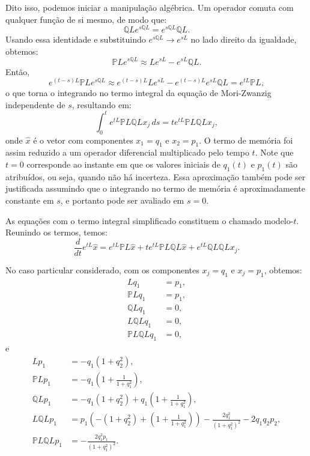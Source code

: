 \documentclass[12pt]{article}
\begin{document}
Dito isso, podemos iniciar a manipulação algébrica. Um operador comuta com qualquer função de si mesmo, de modo que:
\begin{equation*}
	\mathbb{Q}Le^{s\mathbb{Q}L} = e^{s\mathbb{Q}L} \mathbb{Q}L.
\end{equation*}
Usando essa identidade e substituindo $e^{s\mathbb{Q}L} \to e^{sL}$ no lado direito da igualdade, obtemos:
\begin{equation*}
	\mathbb{P}Le^{s\mathbb{Q}L} \approx Le^{sL} - e^{sL} \mathbb{Q}L.
\end{equation*}
Então,
\begin{equation*}
	e^{(t-s)L} \mathbb{P}Le^{s\mathbb{Q}L} \approx e^{(t-s)L} Le^{sL} - e^{(t-s)L} e^{sL} \mathbb{Q}L = e^{tL} \mathbb{P}L,
\end{equation*}
o que torna o integrando no termo integral da equação de Mori-Zwanzig independente de $s$, resultando em:
\begin{equation*}
	\int_0^t e^{tL} \mathbb{P}L \mathbb{Q}L x_j \, ds = t e^{tL} \mathbb{P}L \mathbb{Q}L x_j,
\end{equation*}
onde $\hat{x}$ é o vetor com componentes $x_1 = q_1$ e $x_2 = p_1$. O termo de memória foi assim reduzido a um operador diferencial multiplicado pelo tempo $t$. Note que $t = 0$ corresponde ao instante em que os valores iniciais de $q_1(t)$ e $p_1(t)$ são atribuídos, ou seja, quando não há incerteza. Essa aproximação também pode ser justificada assumindo que o integrando no termo de memória é aproximadamente constante em $s$, e portanto pode ser avaliado em $s = 0$.

As equações com o termo integral simplificado constituem o chamado modelo-$t$. Reunindo os termos, temos:
\begin{equation*}
	\frac{d}{dt} e^{tL} \hat{x} = e^{tL} \mathbb{P}L \hat{x} + t e^{tL} \mathbb{P}L \mathbb{Q}L \hat{x} + e^{tL} \mathbb{Q}L \mathbb{Q}L x_j.
\end{equation*}

No caso particular considerado, com os componentes $x_j = q_1$ e $x_j = p_1$, obtemos:
\begin{align*}
	Lq_1                        & = p_1, \\
	\mathbb{P}Lq_1              & = p_1, \\
	\mathbb{Q}Lq_1              & = 0,   \\
	L\mathbb{Q}Lq_1             & = 0,   \\
	\mathbb{P}L \mathbb{Q}L q_1 & = 0,   
\end{align*}
e
\begin{align*}
	Lp_1 &= -q_1(1 + q_2^2),\\
	\mathbb{P}Lp_1 &= -q_1\left(1 + \frac{1}{1 + q_1^2}\right),\\
	\mathbb{Q}Lp_1 &= -q_1(1 + q_2^2) + q_1\left(1 + \frac{1}{1 + q_1^2}\right),\\
	L\mathbb{Q}Lp_1 &= p_1\left(- (1 + q_2^2) + \left(1 + \frac{1}{1 + q_1^2} \right) \right) - \frac{2q_1^2}{(1 + q_1^2)^2} - 2q_1 q_2 p_2, \\
	\mathbb{P}L\mathbb{Q}Lp_1 & = -\frac{2q_1^2 p_1}{(1 + q_1^2)^2}.
\end{align*}
\end{document}
